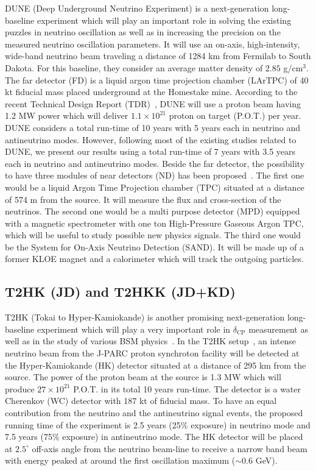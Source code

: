 \documentclass[11pt,a4paper]{article}
\begin{document}
DUNE (Deep Underground Neutrino Experiment) is a next-generation long-baseline experiment which will play an important role in solving the existing puzzles in neutrino oscillation as well as in increasing the precision on the measured neutrino oscillation parameters. It will use an on-axis, high-intensity, wide-band neutrino beam traveling a distance of 1284 km from Fermilab to South Dakota. For this baseline, they consider an average matter density of $2.85$ g/cm$^{3}$.
 The far detector (FD) is a liquid argon time projection chamber (LArTPC) of 40 kt fiducial mass placed underground at the Homestake mine. 
 According to the recent Technical Design Report (TDR)~\cite{DUNE:2021cuw}, DUNE will use a proton beam having 1.2 MW power which will deliver $1.1\times10^{21}$ proton on target (P.O.T.) per year. DUNE considers a total run-time of 10 years with 5 years each in neutrino and antineutrino modes. However,
 following most of the existing studies related to DUNE, we present our results using a total run-time of 7 years with 3.5 years each in neutrino and antineutrino modes.
Beside the far detector, the possibility to have three modules of near detectors (ND) has been proposed~\cite{DUNE:2021tad}. The first one would be a liquid Argon Time Projection chamber (TPC) situated at a distance of 574 m from the source. It will measure the flux and cross-section of the neutrinos. The second one would be a multi purpose detector (MPD) equipped with a magnetic spectrometer with one ton High-Pressure Gaseous Argon TPC, which will be useful to study possible new physics signals. The third one would be 
the System for On-Axis Neutrino Detection (SAND). It will be made up of a former KLOE magnet and a calorimeter which will track the outgoing particles.

\subsection{T2HK (JD) and T2HKK (JD+KD)}


T2HK (Tokai to Hyper-Kamiokande) is another promising next-generation long-baseline experiment which will play a very important role in $\delta_{\mathrm{CP}}$ measurement as well as in the study of various BSM physics~\cite{Kelly:2017kch,Agarwalla:2018nlx,Choubey:2017ppj}. In the T2HK setup~\cite{Abe:2011ts,Hyper-KamiokandeWorkingGroup:2014czz,Hyper-KamiokandeProto-:2015xww}, an intense neutrino beam from the J-PARC proton synchroton facility will be detected at the Hyper-Kamiokande (HK) detector situated at a distance of 295 km from the source. The power of the proton beam at the source is 
1.3 MW which will produce $27\times10^{21}$ P.O.T. in its total 10 years run-time.  The detector is a water Cherenkov (WC) detector with 187 kt of fiducial mass.
To have an equal contribution from the neutrino and the antineutrino signal events, the proposed running time of the experiment is 2.5 years (25\% exposure) in neutrino mode and 7.5 years (75\% exposure) in antineutrino mode.
The HK detector will be placed at $2.5^{\circ}$ off-axis angle from the neutrino beam-line to receive a narrow band beam with energy peaked at around the first oscillation maximum ($\sim 0.6$ GeV).
\end{document}
